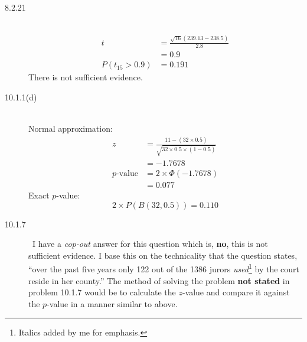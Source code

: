 \documentclass[letterpaper,10pt]{article}
\begin{document}
\begin{description}
\item[8.2.21]\ 
\begin{align*}
t&= \frac{\sqrt{16}(239.13-238.5)}{2.8} \\
&= 0.9 \\
P(t_{15} > 0.9) &= 0.191
\end{align*}
There is not sufficient evidence.

\item[10.1.1(d)]\ \\
Normal approximation:
\begin{align*}
z&= \frac{11-(32\times0.5)}{\sqrt{32\times0.5\times(1-0.5)}} \\
&= -1.7678 \\
p\mbox{-value}&= 2\times\Phi(-1.7678) \\
&= 0.077
\end{align*}
Exact $p$-value:
\[
2\times P(B(32, 0.5))=0.110
\]

\item[10.1.7]\ I have a \emph{cop-out} answer for this question which is, \textbf{no}, this is not sufficient evidence.  I base this on the technicality that the question states, ``over the past five years only 122 out of the 1386 jurors \emph{used}\footnote{Italics added by me for emphasis.} by the court reside in her county.''  The method of solving the problem \textbf{not stated} in problem 10.1.7 would be to calculate the $z$-value and compare it against the $p$-value in a manner similar to above.

\end {description}
\end{document}
